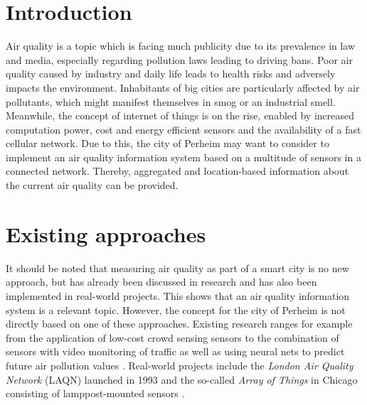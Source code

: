 \documentclass[conference]{IEEEtran}
\begin{document}
\begin{abstract}
\end{abstract}





%
\IEEEpeerreviewmaketitle

\section{Introduction}

Air quality is a topic which is facing much publicity due to its prevalence in law and media, especially regarding pollution laws leading to driving bans. Poor air quality caused by industry and daily life leads to health risks and adversely impacts the environment. Inhabitants of big cities are particularly affected by air pollutants, which might manifest themselves in smog or an industrial smell.
Meanwhile, the concept of internet of things is on the rise, enabled by increased computation power, cost and energy efficient sensors and the availability of a fast cellular network.
\newline
Due to this, the city of Perheim may want to consider to implement an air quality information system based on a multitude of sensors in a connected network. Thereby, aggregated and location-based information about the current air quality can be provided.

\section{Existing approaches}
It should be noted that measuring air quality as part of a smart city is no new approach, but has already been discussed in research \cite{Nagaraj} and has also been implemented in real-world projects. This shows that an air quality information system is a relevant topic. However, the concept for the city of Perheim is not directly based on one of these approaches. Existing research ranges for example from the application of low-cost crowd sensing sensors \cite{Dutta} to the combination of sensors with video monitoring of traffic \cite{Mehta} as well as using neural nets to predict future air pollution values \cite{Kok}. Real-world projects include the \textit{London Air Quality Network} (LAQN) launched in 1993 \cite{Mittal.2018} and the so-called \textit{Array of Things} in Chicago consisting of lamppost-mounted sensors \cite{Adler.2015}.
\end{document}
